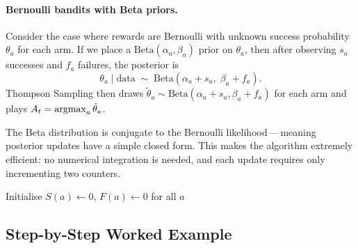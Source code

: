 \paragraph{Bernoulli bandits with Beta priors.}
Consider the case where rewards are Bernoulli with unknown success probability $\theta_a$ for each arm.  If we place a $\text{Beta}(\alpha_a, \beta_a)$ prior on $\theta_a$, then after observing $s_a$ successes and $f_a$ failures, the posterior is
\[
\theta_a \mid \text{data} \;\sim\; \text{Beta}(\alpha_a + s_a,\;\beta_a + f_a).
\]
Thompson Sampling then draws $\tilde\theta_a\sim\text{Beta}(\alpha_a+s_a,\beta_a+f_a)$ for each arm and plays $A_t=\operatorname*{argmax}_a\tilde\theta_a$.

The Beta distribution is conjugate to the Bernoulli likelihood\,---\,meaning posterior updates have a simple closed form.  This makes the algorithm extremely efficient: no numerical integration is needed, and each update requires only incrementing two counters.

\begin{algorithm}[ht]
\caption{Thompson Sampling for Bernoulli Bandits}
\label{alg:thompson}
Initialise $S(a)\leftarrow 0$, $F(a)\leftarrow 0$ for all $a$\;
\end{algorithm}

\subsection*{Step-by-Step Worked Example}

